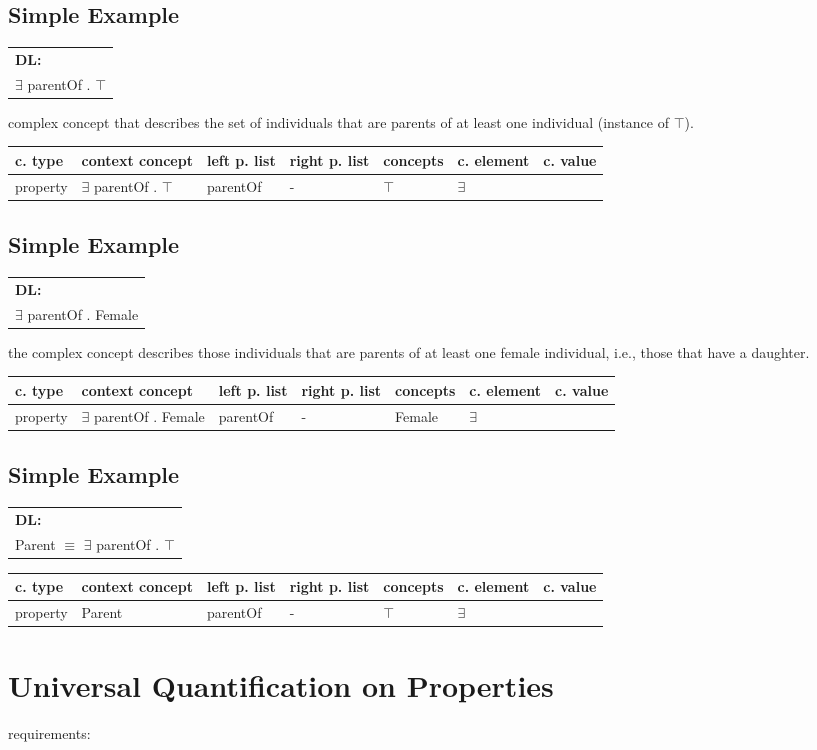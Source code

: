 \documentclass{llncs}
\newenvironment{gcotable}{
  \scriptsize
  \sffamily
  \vspace{0.3cm}
  \begin{tabular}{l|l|l|l|l|l|l}
  \hline
  \textbf{c. type} & \textbf{context concept} & \textbf{left p. list} & \textbf{right p. list} & \textbf{concepts} & \textbf{c. element} & \textbf{c. value} \\
  \hline

}{
  \hline
  \end{tabular}
  \linebreak
}
\newenvironment{DL}{
  \scriptsize
  \sffamily
  \vspace{0.3cm}
  \begin{tabular}{l}
	\textbf{DL:} \\

}{
  \end{tabular}
  \linebreak
}
\begin{document}
\subsection{Simple Example}

\begin{DL}
$\exists$ parentOf . $\top$
\end{DL}

complex concept that describes the set
of individuals that are parents of at least one individual (instance of $\top$). 

\begin{gcotable}
property & $\exists$ parentOf . $\top$ & parentOf & - & $\top$ & $\exists$ \\
\end{gcotable}

\subsection{Simple Example}

\begin{DL}
$\exists$ parentOf . Female
\end{DL}

the complex concept describes those individuals that are parents of at least one
female individual, i.e., those that have a daughter.

\begin{gcotable}
property & $\exists$ parentOf . Female & parentOf & - & Female & $\exists$ \\
\end{gcotable}

\subsection{Simple Example}

\begin{DL}
Parent $\equiv$ $\exists$ parentOf . $\top$
\end{DL}

\begin{gcotable}
property & Parent & parentOf & - & $\top$ & $\exists$ \\
\end{gcotable}

\section{Universal Quantification on Properties}

requirements:
\end{document}

